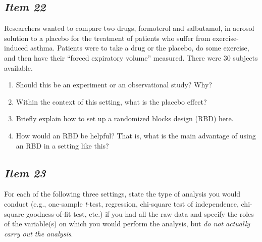 \subsection{\textbf{\textit{Item 22}}}


Researchers wanted to compare two drugs, formoterol and salbutamol, in aerosol solution to a placebo for the treatment of patients who suffer from exercise-induced asthma. Patients were to take a drug or the placebo, do some exercise, and then have their ``forced expiratory volume'' measured. There were 30 subjects available. 


\begin{enumerate}[leftmargin=1cm, itemsep=.2em]


\item Should this be an experiment or an observational study? Why?


\item Within the context of this setting, what is the placebo effect?


\item Briefly explain how to set up a randomized blocks design (RBD) here.


\item How would an RBD be helpful? That is, what is the main advantage of using an RBD in a setting like this?


\end{enumerate}





\subsection{\textbf{\textit{Item 23}}}


For each of the following three settings, state the type of analysis you would conduct (e.g., one-sample \textit{t}-test, regression, chi-square test of independence, chi-square goodness-of-fit test, etc.) if you had all the raw data and specify the roles of the variable(s) on which you would perform the analysis, but \textit{do not actually carry out the analysis}.


